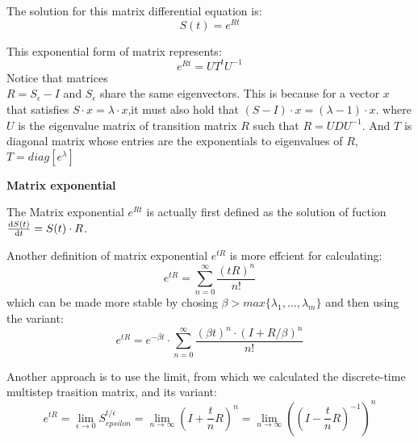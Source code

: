 \documentclass[12pt]{book}
\begin{document}
        The solution for this matrix differential equation is:
        \begin{equation*}
            S(t) = e ^{Rt}
        \end{equation*}

        This exponential form of matrix represents: 
        \begin{equation}\label{eq:\thesection:expmatrix_diagonalize}
            e ^{Rt} = U T^t U ^{-1}
        \end{equation}
        Notice that matrices\\ $R=S_{\epsilon}-I$ and $S_{\epsilon}$ share the same eigenvectors. This is because for a vector $x$ that satisfies $S \cdot x = \lambda \cdot x$,it must also hold that $(S-I) \cdot x = (\lambda-1) \cdot x$.
        where $U$ is the eigenvalue matrix of transition matrix $R$ such that $R = U D U ^{-1}$. And $T$ is diagonal matrix whose entries are the exponentials to eigenvalues of $R$, $T = diag[e ^{\lambda}]$

            \textbf{Matrix exponential}

            The Matrix exponential $e ^{Rt}$ is actually first defined as the solution of fuction $\frac{\textup{d} S(t)}{\textup{d} t} = S(t) \cdot R$.
            
            Another definition of matrix exponential $e ^{tR}$ is more effcient for calculating:
            \begin{equation*}
                e ^{tR} = \sum_{n=0}^{\infty}\frac{(tR)^n}{n!}
            \end{equation*}
            which can be made more stable by chosing $\beta > max\{\lambda_1,...,\lambda_m\}$ and then using the variant:
            \begin{equation*}
                e ^{tR} = e ^{-\beta t} \cdot \sum_{n=0}^{\infty} \frac{(\beta t)^n \cdot (I+R/\beta)^n}{n!}
            \end{equation*}
            
            Another approach is to use the limit, from which we calculated the discrete-time multistep trasition matrix, and its variant:
            \begin{equation*}
                e ^{tR} = \lim_{\epsilon \rightarrow 0} S_{epsilon}^{t/\epsilon}
                = \lim_{n \rightarrow \infty}\left(I+\frac{t}{n}R\right)^n 
                = \lim_{n \rightarrow \infty}\left( \left(I - \frac{t}{n}R \right)^{-1} \right)^n 
            \end{equation*}
            
\end{document}
